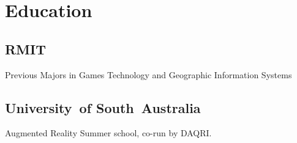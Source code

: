 \documentclass[a4paper]{deedy-resume_twopage} %
\begin{document}
%
\begin{minipage}[t]{0.33\textwidth} %


  \section{Education}

  \subsection{RMIT}

  Previous Majors in Games Technology and Geographic Information Systems \\

  \sectionspace %

  \subsection{University\hbox{ }of South~Australia}


  Augmented Reality Summer school, co-run by DAQRI. \\

  \sectionspace %




\end{minipage}
\end{document}
